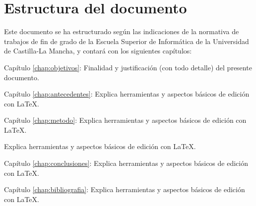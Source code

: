 \section{Estructura del documento}

Este documento se ha estructurado según las indicaciones de la normativa de trabajos de fin de grado de la Escuela Superior de Informática de la Universidad de Castilla-La Mancha, y contará con  los siguientes capítulos:
\begin{definitionlist}
\item[Capítulo \ref{chap:objetivos}: \nameref{chap:objetivos}] Finalidad y justificación  (con todo detalle) del presente documento.
\item[Capítulo \ref{chap:antecedentes}: \nameref{chap:antecedentes}] Explica herramientas y aspectos básicos de edición con \LaTeX.
\item[Capítulo \ref{chap:metodo}: \nameref{chap:metodo}] Explica herramientas y aspectos básicos de edición con \LaTeX.
\item[Capítulo \ref{chap:resultados}: \nameref{chap:resultados] Explica herramientas y aspectos básicos de edición con \LaTeX.
\item[Capítulo \ref{chap:conclusiones}: \nameref{chap:conclusiones}] Explica herramientas y aspectos básicos de edición con \LaTeX.
\item[Capítulo \ref{chap:bibliografia}: \nameref{chap:bibliografia}] Explica herramientas y aspectos básicos de edición con \LaTeX.
\end{definitionlist}



